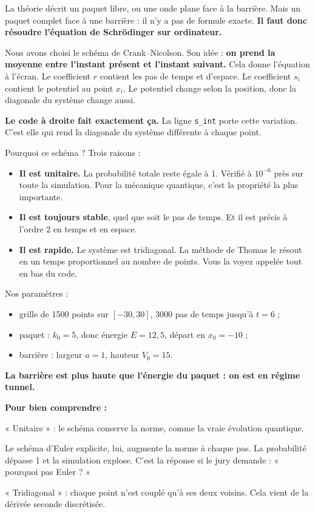 \documentclass[12pt,a4paper]{article}
\newenvironment{comprendre}%
{\par\medskip\noindent\hrulefill\par\nopagebreak\textbf{Pour bien comprendre :}\par}%
{\par\nopagebreak\noindent\hrulefill\par\medskip}
\begin{document}
	La théorie décrit un paquet libre, ou une onde plane face à la barrière.
	Mais un paquet complet face à une barrière : il n'y a pas de formule exacte.
	\textbf{Il faut donc résoudre l'équation de Schrödinger sur ordinateur.}
	
	Nous avons choisi le schéma de Crank--Nicolson.
	Son idée : \textbf{on prend la moyenne entre l'instant présent et l'instant suivant.}
	Cela donne l'équation à l'écran.
	Le coefficient $r$ contient les pas de temps et d'espace.
	Le coefficient $s_i$ contient le potentiel au point $x_i$.
	Le potentiel change selon la position, donc la diagonale du système change aussi.
	
	\textbf{Le code à droite fait exactement ça.}
	La ligne \texttt{s\_int} porte cette variation.
	C'est elle qui rend la diagonale du système différente à chaque point.
	
	Pourquoi ce schéma ? Trois raisons :
	
	\begin{itemize}
		\item \textbf{Il est unitaire.} La probabilité totale reste égale à 1.
		Vérifié à $10^{-6}$ près sur toute la simulation.
		Pour la mécanique quantique, c'est la propriété la plus importante.
		\item \textbf{Il est toujours stable}, quel que soit le pas de temps.
		Et il est précis à l'ordre 2 en temps et en espace.
		\item \textbf{Il est rapide.} Le système est tridiagonal.
		La méthode de Thomas le résout en un temps proportionnel au nombre de points.
		Vous la voyez appelée tout en bas du code.
	\end{itemize}
	
	Nos paramètres :
	
	\begin{itemize}
		\item grille de 1500 points sur $[-30, 30]$, 3000 pas de temps jusqu'à $t = 6$ ;
		\item paquet : $k_0 = 5$, donc énergie $E = 12{,}5$, départ en $x_0 = -10$ ;
		\item barrière : largeur $a = 1$, hauteur $V_0 = 15$.
	\end{itemize}
	
	\textbf{La barrière est plus haute que l'énergie du paquet : on est en régime tunnel.}
	
	\begin{comprendre}
		« Unitaire » : le schéma conserve la norme, comme la vraie évolution quantique.
		
		Le schéma d'Euler explicite, lui, augmente la norme à chaque pas.
		La probabilité dépasse 1 et la simulation explose.
		C'est la réponse si le jury demande : « pourquoi pas Euler ? »
		
		« Tridiagonal » : chaque point n'est couplé qu'à ses deux voisins.
		Cela vient de la dérivée seconde discrétisée.
	\end{comprendre}
	
\end{document}
